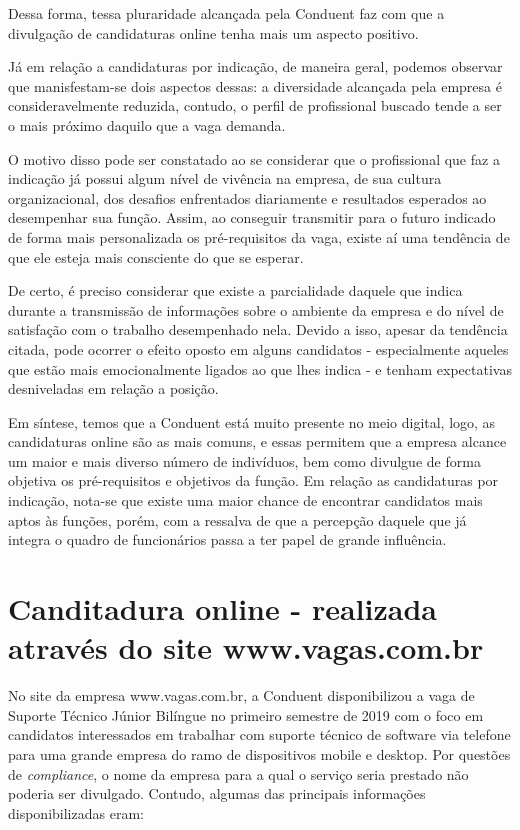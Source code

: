 \documentclass[12pt]{article}
\begin{document}
Dessa forma, tessa pluraridade alcançada pela Conduent faz com que a divulgação de candidaturas online tenha mais um aspecto positivo. 

Já em relação a candidaturas por indicação, de maneira geral, podemos observar que manisfestam-se dois aspectos dessas: a diversidade alcançada pela empresa é consideravelmente reduzida, contudo, o perfil de profissional buscado tende a ser o mais próximo daquilo que a vaga demanda. 

O motivo disso pode ser constatado ao se considerar que o profissional que faz a indicação já possui algum nível de vivência na empresa, de sua cultura organizacional, dos desafios enfrentados diariamente e resultados esperados ao desempenhar sua função. Assim, ao conseguir transmitir para o futuro indicado de forma mais personalizada os pré-requisitos da vaga, existe aí uma tendência de que ele esteja mais consciente do que se esperar.  

De certo, é preciso considerar que existe a parcialidade daquele que indica durante a transmissão de informações sobre o ambiente da empresa e do nível de satisfação com o trabalho desempenhado nela. Devido a isso, apesar da tendência citada, pode ocorrer o efeito oposto em alguns candidatos - especialmente aqueles que estão mais emocionalmente ligados ao que lhes indica - e tenham expectativas desniveladas em relação a posição.

Em síntese, temos que a Conduent está muito presente no meio digital, logo, as candidaturas online são as mais comuns, e essas permitem que a empresa alcance um maior e mais diverso número de indivíduos, bem como divulgue de forma objetiva os pré-requisitos e objetivos da função. Em relação as candidaturas por indicação, nota-se que existe uma maior chance de encontrar candidatos mais aptos às funções, porém, com a ressalva de que a percepção daquele que já integra o quadro de funcionários passa a ter papel de grande influência.  
 
\section*{Canditadura online - realizada através do site www.vagas.com.br}
 
No site da empresa www.vagas.com.br, a Conduent disponibilizou a vaga de Suporte Técnico Júnior Bilíngue no primeiro semestre de 2019 com o foco em candidatos interessados em trabalhar com suporte técnico de software via telefone para uma grande empresa do ramo de dispositivos mobile e desktop. Por questões de  \emph {compliance}, o nome da empresa para a qual o serviço seria prestado não poderia ser divulgado. Contudo, algumas das principais informações disponibilizadas eram: 
 
\end{document}
